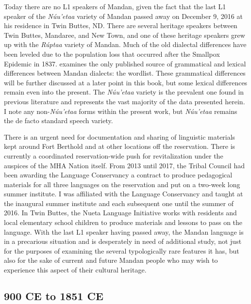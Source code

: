 Today there are no L1 speakers of Mandan, given the fact that the last L1 speaker of the \textit{Núu'etaa} variety of Mandan passed away on December 9, 2016 at his residence in Twin Buttes, ND. There are several heritage speakers between Twin Buttes, Mandaree, and New Town, and one of these heritage speakers grew up with the \textit{Rúptaa} variety of Mandan. Much of the old dialectal differences have been leveled due to the population loss that occurred after the Smallpox Epidemic in 1837. \citet{carter1991a} examines the only published source of grammatical and lexical differences between Mandan dialects: the \citet{maximilian1839} wordlist. These grammatical differences will be further discussed at a later point in this book, but some lexical differences remain even into the present. The \textit{Núu'etaa} variety is the prevalent one found in previous literature and represents the vast majority of the data presented herein. I note any non-\textit{Núu'etaa} forms within the present work, but \textit{Núu'etaa} remains the de facto standard speech variety.

There is an urgent need for documentation and sharing of linguistic materials kept around Fort Berthold and at other locations off the reservation. There is currently a coordinated reservation-wide push for revitalization under the auspices of the MHA Nation itself. From 2013 until 2017, the Tribal Council had been awarding the Language Conservancy a contract to produce pedagogical materials for all three languages on the reservation and put on a two-week long summer institute. I was affiliated with the Language Conservancy and taught at the inaugural summer institute and each subsequent one until the summer of 2016. In Twin Buttes, the Nueta Language Initiative works with residents and local elementary school children to produce materials and lessons to pass on the language. With the last L1 speaker having passed away, the Mandan language is in a precarious situation and is desperately in need of additional study, not just for the purposes of examining the several typologically rare features it has, but also for the sake of current and future Mandan people who may wish to experience this aspect of their cultural heritage. 

\subsection{900 CE to 1851 CE}

